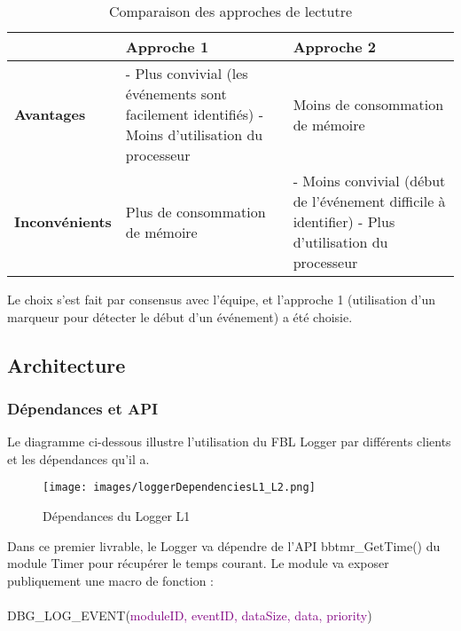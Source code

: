 \documentclass[a4paper, 12pt]{report}
\begin{document}
\begin{enumerate}
\begin{itemize}
\begin{table}[H]
\begin{center}
            \begin{tabularx}{0.8\textwidth} { 
              | >{\centering\arraybackslash}X 
              | >{\centering\arraybackslash}X 
              | >{\centering\arraybackslash}X | }
             \hline
              & \textbf{Approche 1} & \textbf{Approche 2} \\
             \hline
            \textbf{Avantages}  & - Plus convivial (les événements sont facilement identifiés) \newline - Moins d'utilisation du processeur  & Moins de consommation de mémoire \\
            \hline
            \textbf{Inconvénients} & Plus de consommation de mémoire & - Moins convivial (début de l'événement difficile à identifier) \newline  - Plus d'utilisation du processeur 
  \\
  \hline

            \end{tabularx}
            \caption{Comparaison des approches de lectutre}
            \label{tab:lvrbl1}
            \end{center}
            \end{table}
    \end{itemize}

    Le choix s'est fait par consensus avec l'équipe, et l'approche 1 (utilisation d’un marqueur pour détecter le début d’un événement) a été choisie.
\end{enumerate}

\subsection{Architecture}
       
    \subsubsection{Dépendances et API}
     Le diagramme ci-dessous illustre l'utilisation du FBL Logger par différents clients et les dépendances qu'il a.\\
    
        \begin{figure}[H]
           \centering
           \texttt{[image: images/loggerDependenciesL1\_L2.png]}
           \caption{Dépendances du Logger L1}
           \label{fig:depdenL1}
       \end{figure}
        Dans ce premier livrable, le Logger va dépendre de l'API {\color{green}bbtmr\_GetTime}() du module Timer pour récupérer le temps courant. Le module va exposer publiquement une macro de fonction :\\
    \\
    {\color{green}DBG\_LOG\_EVENT}(\textcolor{purple}{moduleID, eventID, dataSize, data, priority})
    \\
\end{document}
